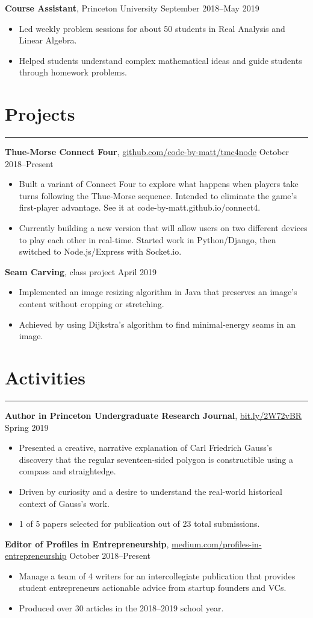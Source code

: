 \documentclass[11pt]{article}
\newcommand{\resumesection}[1]{\vspace{-0.2cm}\section*{#1}\vspace{-0.2cm}\hrule\vspace{0.2cm}}
\begin{document}
\textbf{Course Assistant}, Princeton University \hfill September 2018--May 2019
\begin{itemize}
	\item Led weekly problem sessions for about 50 students in Real Analysis and Linear Algebra.
	\item Helped students understand complex mathematical ideas and guide students through homework problems.
\end{itemize}

\resumesection{Projects}

\textbf{Thue-Morse Connect Four}, \href{https://github.com/code-by-matt/tmc4node}{github.com/code-by-matt/tmc4node}  \hfill October 2018--Present
\begin{itemize}
	\item Built a variant of Connect Four to explore what happens when players take turns following the Thue-Morse sequence. Intended to eliminate the game's first-player advantage. See it at code-by-matt.github.io/connect4.
	\item Currently building a new version that will allow users on two different devices to play each other in real-time. Started work in Python/Django, then switched to Node.js/Express with Socket.io.
\end{itemize}

\textbf{Seam Carving}, class project \hfill April 2019
\begin{itemize}
	\item Implemented an image resizing algorithm in Java that preserves an image's content without cropping or stretching.
	\item Achieved by using Dijkstra's algorithm to find minimal-energy seams in an image.
\end{itemize}

\resumesection{Activities}

\textbf{Author in Princeton Undergraduate Research Journal}, \href{https://bit.ly/2W72vBR}{bit.ly/2W72vBR} \hfill Spring 2019
\begin{itemize}
	\item Presented a creative, narrative explanation of Carl Friedrich Gauss's discovery that the regular seventeen-sided polygon is constructible using a compass and straightedge.
	\item Driven by curiosity and a desire to understand the real-world historical context of Gauss's work.
	\item 1 of 5 papers selected for publication out of 23 total submissions.
\end{itemize}

\textbf{Editor of Profiles in Entrepreneurship}, \href{https://medium.com/profiles-in-entrepreneurship}{medium.com/profiles-in-entrepreneurship} \hfill October 2018--Present
\begin{itemize}
	\item Manage a team of 4 writers for an intercollegiate publication that provides student entrepreneurs actionable advice from startup founders and VCs.
	\item Produced over 30 articles in the 2018--2019 school year.
\end{itemize}
\end{document}
